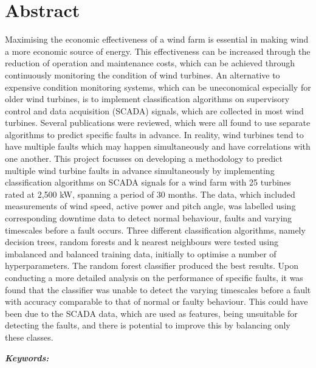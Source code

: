 \chapter*{Abstract}

Maximising the economic effectiveness of a wind farm is essential in making
wind a more economic source of energy. This effectiveness can be increased
through the reduction of operation and maintenance costs, which can be
achieved through continuously monitoring the condition of wind turbines. An
alternative to expensive condition monitoring systems, which can be
uneconomical especially for older wind turbines, is to implement
classification algorithms on supervisory control and data acquisition (SCADA)
signals, which are collected in most wind turbines. Several publications were
reviewed, which were all found to use separate algorithms to predict specific
faults in advance. In reality, wind turbines tend to have multiple faults
which may happen simultaneously and have correlations with one another. This
project focusses on developing a methodology to predict multiple wind turbine
faults in advance simultaneously by implementing classification algorithms on
SCADA signals for a wind farm with 25 turbines rated at 2,500 kW, spanning a
period of 30 months. The data, which included measurements of wind speed,
active power and pitch angle, was labelled using corresponding downtime data
to detect normal behaviour, faults and varying timescales before a fault
occurs. Three different classification algorithms, namely decision trees,
random forests and k nearest neighbours were tested using imbalanced and
balanced training data, initially to optimise a number of hyperparameters. The
random forest classifier produced the best results. Upon conducting a more
detailed analysis on the performance of specific faults, it was found that the
classifier was unable to detect the varying timescales before a fault with
accuracy comparable to that of normal or faulty behaviour. This could have
been due to the SCADA data, which are used as features, being unsuitable for
detecting the faults, and there is potential to improve this by balancing only
these classes.

\noindent\textbf{\textit{Keywords:}} \keywords
